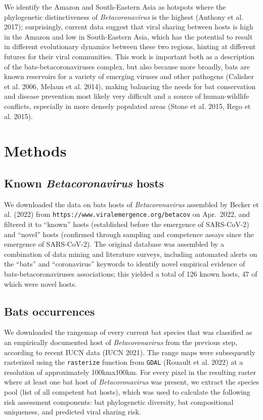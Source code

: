 \documentclass[11pt]{article}
\begin{document}
We identify the Amazon and South-Eastern Asia as hotspots where the
phylogenetic distinctiveness of \emph{Betacoronavirus} is the highest
(Anthony et al. 2017); surprisingly, current data suggest that viral
sharing between hosts is high in the Amazon and low in South-Eastern
Asia, which has the potential to result in different evolutionary
dynamics between these two regions, hinting at different futures for
their viral communities. This work is important both as a description of
the bats-betacoronaviruses complex, but also because more broadly, bats
are known reservoirs for a variety of emerging viruses and other
pathogens (Calisher et al. 2006, Melaun et al. 2014), making balancing
the needs for bat conservation and disease prevention most likely very
difficult and a source of human-wildlife conflicts, especially in more
densely populated areas (Stone et al. 2015, Rego et al. 2015).

\hypertarget{methods}{%
\section{Methods}\label{methods}}

\hypertarget{known-betacoronavirus-hosts}{%
\subsection{\texorpdfstring{Known \emph{Betacoronavirus}
hosts}{Known Betacoronavirus hosts}}\label{known-betacoronavirus-hosts}}

We downloaded the data on bats hosts of \emph{Betacoronavirus} assembled
by Becker et al. (2022) from
\texttt{https://www.viralemergence.org/betacov} on Apr.~2022, and
filtered it to ``known'' hosts (established before the emergence of
SARS-CoV-2) and ``novel'' hosts (confirmed through sampling and
competence assays since the emergence of SARS-CoV-2). The original
database was assembled by a combination of data mining and literature
surveys, including automated alerts on the ``bats'' and ``coronavirus''
keywords to identify novel empirical evidence of bats-betacoronaviruses
associations; this yielded a total of 126 known hosts, 47 of which were
novel hosts.

\hypertarget{bats-occurrences}{%
\subsection{Bats occurrences}\label{bats-occurrences}}

We downloaded the rangemap of every current bat species that was
classified as an empirically documented host of \emph{Betacoronavirus}
from the previous step, according to recent IUCN data (IUCN 2021). The
range maps were subsequently rasterized using the \texttt{rasterize}
function from \texttt{GDAL} (Rouault et al. 2022) at a resolution of
approximately 100kmx100km. For every pixel in the resulting raster where
at least one bat host of \emph{Betacoronavirus} was present, we extract
the species pool (list of all competent bat hosts), which was used to
calculate the following risk assessment components: bat phylogenetic
diversity, bat compositional uniqueness, and predicted viral sharing
risk.
\end{document}
